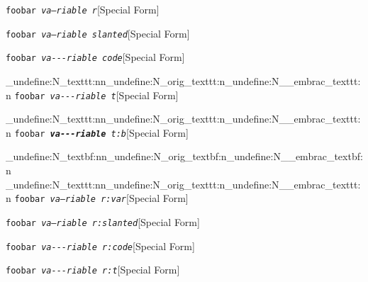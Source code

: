 \documentclass{book}
\begin{document}
%
\noindent\texttt{foobar \EmbracOn{}\textnormal{\textsl{\EmbracOff{}\textnormal{va---riable}\EmbracOn{} r}}\EmbracOff{}}\hfill[Special Form]



%
\noindent\texttt{foobar \EmbracOn{}\textnormal{\textsl{\textsl{va---riable} slanted}}\EmbracOff{}}\hfill[Special Form]



%
\noindent\texttt{foobar \EmbracOn{}\textnormal{\textsl{\texttt{va{-}{-}{-}riable} code}}\EmbracOff{}}\hfill[Special Form]


\ExplSyntaxOn%
\cs_undefine:N{\embrac_texttt:nn}\cs_undefine:N{\embrac_orig_texttt:n}\cs_undefine:N{\__embrac_texttt:n}%
\ExplSyntaxOff%
%
\noindent\texttt{foobar \EmbracOn{}\textnormal{\textsl{\texttt{va{-}{-}{-}riable} t}}\EmbracOff{}}\hfill[Special Form]


\ExplSyntaxOn%
\cs_undefine:N{\embrac_texttt:nn}\cs_undefine:N{\embrac_orig_texttt:n}\cs_undefine:N{\__embrac_texttt:n}%
\ExplSyntaxOff%
%
\noindent\texttt{foobar \EmbracOn{}\textnormal{\textsl{\texttt{\textbf{va{-}{-}{-}riable}} t:b}}\EmbracOff{}}\hfill[Special Form]


\ExplSyntaxOn%
\cs_undefine:N{\embrac_textbf:nn}\cs_undefine:N{\embrac_orig_textbf:n}\cs_undefine:N{\__embrac_textbf:n}%
\cs_undefine:N{\embrac_texttt:nn}\cs_undefine:N{\embrac_orig_texttt:n}\cs_undefine:N{\__embrac_texttt:n}%
\ExplSyntaxOff%
%
\noindent\texttt{foobar \EmbracOn{}\textnormal{\textsl{\EmbracOff{}\textnormal{\textsl{va---riable}}\EmbracOn{} r:var}}\EmbracOff{}}\hfill[Special Form]



%
\noindent\texttt{foobar \EmbracOn{}\textnormal{\textsl{\EmbracOff{}\textnormal{\textsl{va---riable}}\EmbracOn{} r:slanted}}\EmbracOff{}}\hfill[Special Form]



%
\noindent\texttt{foobar \EmbracOn{}\textnormal{\textsl{\EmbracOff{}\textnormal{\texttt{va{-}{-}{-}riable}}\EmbracOn{} r:code}}\EmbracOff{}}\hfill[Special Form]



%
\noindent\texttt{foobar \EmbracOn{}\textnormal{\textsl{\EmbracOff{}\textnormal{\texttt{va{-}{-}{-}riable}}\EmbracOn{} r:t}}\EmbracOff{}}\hfill[Special Form]
\end{document}
